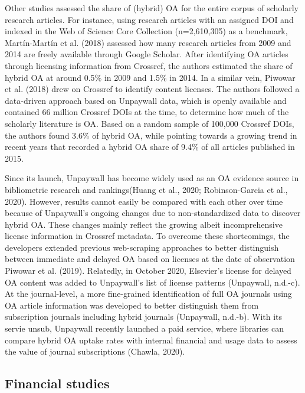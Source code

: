 \documentclass[a4paper,man,floatsintext,longtable,noextraspace,12pt]{apa6}
\begin{document}
Other studies assessed the share of (hybrid) OA for the entire corpus of
scholarly research articles. For instance, using research articles with
an assigned DOI and indexed in the Web of Science Core Collection
(n=2,610,305) as a benchmark, Martín-Martín et al. (2018) assessed how
many research articles from 2009 and 2014 are freely available through
Google Scholar. After identifying OA articles through licensing
information from Crossref, the authors estimated the share of hybrid OA
at around 0.5\% in 2009 and 1.5\% in 2014. In a similar vein, Piwowar et
al. (2018) drew on Crossref to identify content licenses. The authors
followed a data-driven approach based on Unpaywall data, which is openly
available and contained 66 million Crossref DOIs at the time, to
determine how much of the scholarly literature is OA. Based on a random
sample of 100,000 Crossref DOIs, the authors found 3.6\% of hybrid OA,
while pointing towards a growing trend in recent years that recorded a
hybrid OA share of 9.4\% of all articles published in 2015.

Since its launch, Unpaywall has become widely used as an OA evidence
source in bibliometric research and rankings(Huang et al., 2020;
Robinson-Garcia et al., 2020). However, results cannot easily be
compared with each other over time because of Unpaywall's ongoing
changes due to non-standardized data to discover hybrid OA. These
changes mainly reflect the growing albeit incomprehensive license
information in Crossref metadata. To overcome these shortcomings, the
developers extended previous web-scraping approaches to better
distinguish between immediate and delayed OA based on licenses at the
date of observation Piwowar et al. (2019). Relatedly, in October 2020,
Elsevier's license for delayed OA content was added to Unpaywall's list
of license patterns (Unpaywall, n.d.-c). At the journal-level, a more
fine-grained identification of full OA journals using OA article
information was developed to better distinguish them from subscription
journals including hybrid journals (Unpaywall, n.d.-b). With its servie
unsub, Unpaywall recently launched a paid service, where libraries can
compare hybrid OA uptake rates with internal financial and usage data to
assess the value of journal subscriptions (Chawla, 2020).

\hypertarget{financial-studies}{%
\subsection{Financial studies}\label{financial-studies}}
\end{document}
